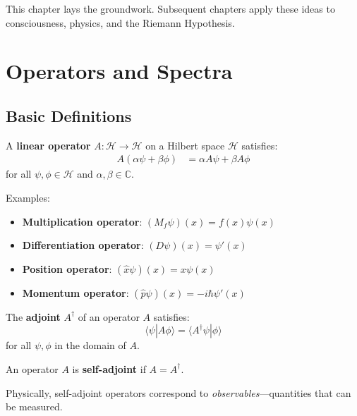 This chapter lays the groundwork. Subsequent chapters apply these ideas to consciousness, physics, and the Riemann Hypothesis.

\section{Operators and Spectra}

\subsection{Basic Definitions}

\begin{definition}\label{def:linear-operator}
A \textbf{linear operator} $A: \mathcal{H} \to \mathcal{H}$ on a Hilbert space $\mathcal{H}$ satisfies:
\begin{align}
A(\alpha \psi + \beta \phi) &= \alpha A\psi + \beta A\phi
\end{align}
for all $\psi, \phi \in \mathcal{H}$ and $\alpha, \beta \in \mathbb{C}$.

Examples:
\begin{itemize}
\item \textbf{Multiplication operator}: $(M_f \psi)(x) = f(x) \psi(x)$
\item \textbf{Differentiation operator}: $(D\psi)(x) = \psi'(x)$
\item \textbf{Position operator}: $(\hat{x}\psi)(x) = x \psi(x)$
\item \textbf{Momentum operator}: $(\hat{p}\psi)(x) = -i\hbar \psi'(x)$
\end{itemize}
\end{definition}

\begin{definition}\label{def:adjoint-operator}
The \textbf{adjoint} $A^\dagger$ of an operator $A$ satisfies:
\begin{equation}
\langle \psi | A\phi \rangle = \langle A^\dagger \psi | \phi \rangle
\end{equation}
for all $\psi, \phi$ in the domain of $A$.
\end{definition}

\begin{definition}\label{def:self-adjoint}
An operator $A$ is \textbf{self-adjoint} if $A = A^\dagger$.

Physically, self-adjoint operators correspond to \textit{observables}---quantities that can be measured.
\end{definition}

